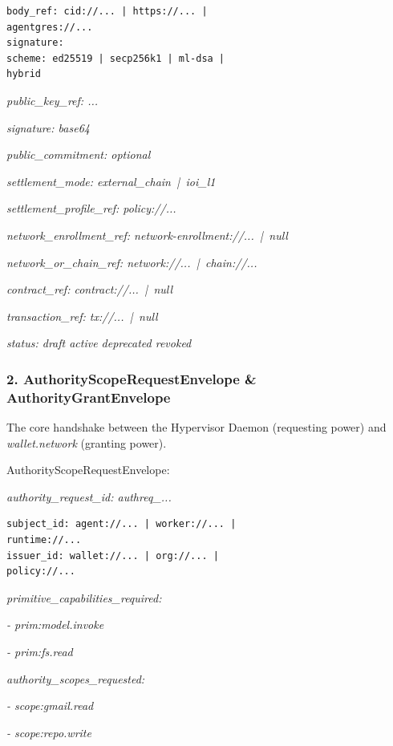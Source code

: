 \documentclass[
  11pt,
]{article}
\begin{document}
\begin{lstlisting}[language={},basicstyle=\ttfamily\scriptsize]
body_ref: cid://... | https://... |
agentgres://...
signature:
scheme: ed25519 | secp256k1 | ml-dsa |
hybrid
\end{lstlisting}

\emph{public\_key\_ref: ...}

\emph{signature: base64}

\emph{public\_commitment: optional}

\emph{settlement\_mode: external\_chain \,|\, ioi\_l1}

\emph{settlement\_profile\_ref: policy://...}

\emph{network\_enrollment\_ref: network-enrollment://... \,|\, null}

\emph{network\_or\_chain\_ref: network://... \,|\, chain://...}

\emph{contract\_ref: contract://... \,|\, null}

\emph{transaction\_ref: tx://... \,|\, null}

\emph{status: draft \textbar{} active \textbar{} deprecated \textbar{}
revoked}

\hypertarget{authorityscoperequestenvelope-authoritygrantenvelope}{%
\subsubsection{2. AuthorityScopeRequestEnvelope \&
AuthorityGrantEnvelope}\label{authorityscoperequestenvelope-authoritygrantenvelope}}

The core handshake between the Hypervisor Daemon (requesting power) and
\emph{wallet.network} (granting power).

AuthorityScopeRequestEnvelope:

\emph{authority\_request\_id: authreq\_...}

\begin{lstlisting}[language={},basicstyle=\ttfamily\scriptsize]
subject_id: agent://... | worker://... |
runtime://...
issuer_id: wallet://... | org://... |
policy://...
\end{lstlisting}
\emph{primitive\_capabilities\_required:}

\emph{- prim:model.invoke}

\emph{- prim:fs.read}

\emph{authority\_scopes\_requested:}

\emph{- scope:gmail.read}

\emph{- scope:repo.write}
\end{document}
